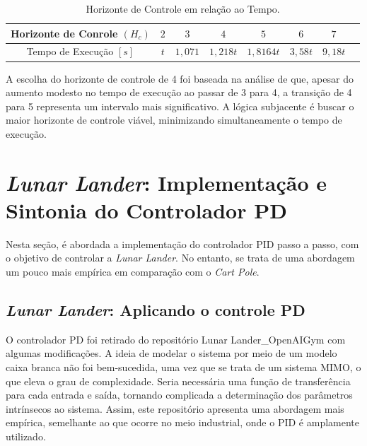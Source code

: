 \documentclass[12pt,           %
a4paper,                       %
openany,                       %
oneside,                       %
chapter=TITLE,                 %
english,                       %
spanish,                       %
brazil,                        %
sumario=tradicional]{abntex2}  %
\begin{document}
\begin{OnehalfSpace}
\begin{table}[H]
	\centering
	\vspace*{-.2cm}
	\caption{Horizonte de Controle em relação ao Tempo.}
	\begin{tabular}{|c|c|c|c|c|c|c|c|}
	\hline
           Horizonte de Conrole $(H_c)$ & $2$ & $3$ & $4$ & $5$ & $6$ & $7$ \\
            \hline
            Tempo de Execução $[s]$ & $t$ & $1,071$ & $1,218t$ & $1,8164t$ & $3,58t$ & $9,18t$\\ 
            \hline
	\end{tabular}  
    \label{tab:HCcartpole}                 %
\end{table}
\vspace*{-0.7cm}
{\raggedright {}}

A escolha do horizonte de controle de 4 foi baseada na análise de que, apesar do aumento modesto no tempo de execução ao passar de 3 para 4, a transição de 4 para 5 representa um intervalo mais significativo. A lógica subjacente é buscar o maior horizonte de controle viável, minimizando simultaneamente o tempo de execução.

\section{\textit{Lunar Lander}: Implementação e Sintonia do Controlador PD}
\label{sec:pidLunarLander} 

Nesta seção, é abordada a implementação do controlador PID passo a passo, com o objetivo de controlar a \textit{Lunar Lander}. No entanto, se trata de uma abordagem um pouco mais empírica em comparação com o \textit{Cart Pole}.

\subsection{\textit{Lunar Lander}: Aplicando o controle PD}
\label{sec:pidLunarLanderEC} 

O controlador PD foi retirado do repositório Lunar Lander\_OpenAIGym \cite{llpid} com algumas modificações. A ideia de modelar o sistema por meio de um modelo caixa branca não foi bem-sucedida, uma vez que se trata de um sistema MIMO, o que eleva o grau de complexidade. Seria necessária uma função de transferência para cada entrada e saída, tornando complicada a determinação dos parâmetros intrínsecos ao sistema. Assim, este repositório apresenta uma abordagem mais empírica, semelhante ao que ocorre no meio industrial, onde o PID é amplamente utilizado.


\end{OnehalfSpace}
\end{document}
